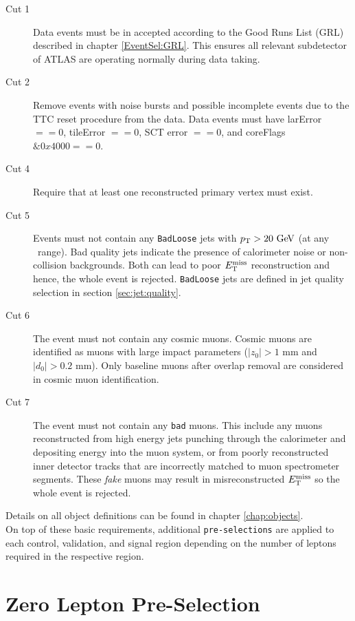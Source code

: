 \begin{description}
\item[Cut 1] Data events must be in accepted according to the Good Runs List (GRL) described in chapter \ref{EventSel:GRL}.  This ensures all relevant subdetector of ATLAS are operating normally during data taking. 
\item[Cut 2] Remove events with noise bursts and possible incomplete events due to the TTC reset procedure from the data. Data events must have larError $== 0$, tileError $== 0$, SCT error $==0$, and coreFlags $\&0x4000 == 0$.
\item[Cut 4] Require that at least one reconstructed primary vertex must exist.
\item[Cut 5] Events must not contain any {\tt BadLoose} jets with $\pT > 20 \gev$ (at any \eta\ range). Bad quality jets indicate the presence of calorimeter noise or non-collision backgrounds. Both can lead to poor $E_{\mathrm{T}}^{\mathrm{miss}}$ reconstruction and hence, the whole event is rejected.  {\tt BadLoose} jets are defined in jet quality selection in section \ref{sec:jet:quality}.  
\item[Cut 6] The event must not contain any cosmic muons.  Cosmic muons are identified as muons with large impact parameters  ($|z_0| > 1$ mm and $|d_0| > 0.2$ mm).  Only baseline muons after overlap removal are considered in cosmic muon identification.
\item[Cut 7] The event must not contain any {\tt bad} muons.  This include any muons reconstructed from high energy jets punching through the calorimeter and depositing energy into the muon system, or from poorly reconstructed inner detector tracks that are incorrectly matched to muon spectrometer segments. These {\it fake} muons may result in misreconstructed $E_{\mathrm{T}}^{\mathrm{miss}}$ so the whole event is rejected.
\end{description}

\indent Details on all object definitions can be found in chapter \ref{chap:objects}. \\

\indent On top of these basic requirements, additional {\tt pre-selections} are applied to each control, validation, and signal region depending on the number of leptons required in the respective region.  \\

\section{Zero Lepton Pre-Selection}

